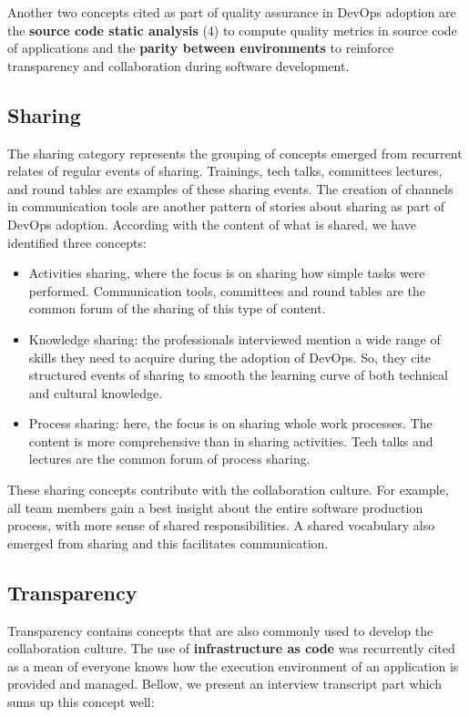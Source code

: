 Another two concepts cited as part of quality assurance in DevOps adoption are
the \textbf{source code static analysis} (4) to compute quality metrics in
source code of applications and the \textbf{parity between environments} to
reinforce transparency and collaboration during software development.

\subsection{Sharing}

The sharing category represents the grouping of concepts emerged from recurrent
relates of regular events of sharing. Trainings, tech talks, committees
lectures, and round tables are examples of these sharing events. The creation
of channels in communication tools are another pattern of stories about sharing
as part of DevOps adoption. According with the content of what is shared, we
have identified three concepts:

\begin{itemize}
\item Activities sharing, where the focus is on sharing how simple tasks were
performed. Communication tools, committees and round tables are the common
forum of the sharing of this type of content.
\item Knowledge sharing: the professionals interviewed mention a wide range of
skills they need to acquire during the adoption of DevOps. So, they cite
structured events of sharing to smooth the learning curve of both technical and
cultural knowledge.
\item Process sharing: here, the focus is on sharing whole work processes. The
content is more comprehensive than in sharing activities. Tech talks and
lectures are the common forum of process sharing.
\end{itemize}

These sharing concepts contribute with the collaboration culture. For example,
all team members gain a best insight about the entire software production
process, with more sense of shared responsibilities. A shared vocabulary also
emerged from sharing and this facilitates communication.

\subsection{Transparency}

Transparency contains concepts that are also commonly used to develop the
collaboration culture. The use of \textbf{infrastructure as code} was
recurrently cited as a mean of everyone knows how the execution environment of
an application is provided and managed. Bellow, we present an interview
transcript part which sums up this concept well:


